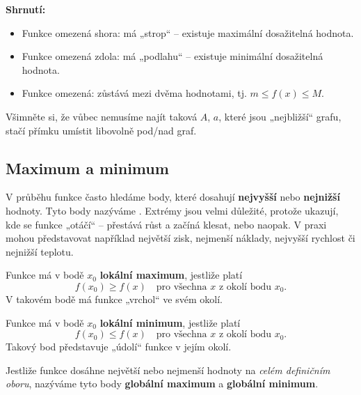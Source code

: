 \documentclass[12pt,a4paper]{article}
\begin{document}
\begin{notebox}
\textbf{Shrnutí:}
\begin{itemize}
    \item Funkce omezená shora: má „strop“ – existuje maximální dosažitelná hodnota.
    \item Funkce omezená zdola: má „podlahu“ – existuje minimální dosažitelná hodnota.
    \item Funkce omezená: zůstává mezi dvěma hodnotami, tj. \(m \leq f(x) \leq M\).
\end{itemize}
Všimněte si, že vůbec nemusíme najít taková $A$, $a$, které jsou „nejbližší“ grafu, 
stačí přímku umístit libovolně pod/nad graf.
\end{notebox}


\subsection*{Maximum a minimum}

V průběhu funkce často hledáme body, které dosahují \textbf{nejvyšší} nebo \textbf{nejnižší} hodnoty.  
Tyto body nazýváme .  
Extrémy jsou velmi důležité, protože ukazují, kde se funkce „otáčí“ – přestává růst a začíná klesat, nebo naopak.  
V praxi mohou představovat například největší zisk, nejmenší náklady, nejvyšší rychlost či nejnižší teplotu.

\begin{definitionbox}

    Funkce má v bodě \(x_0\) \textbf{lokální maximum}, jestliže platí
    \[
    f(x_0) \geq f(x)
    \quad \text{pro všechna } x \text{ z okolí bodu } x_0.
    \]
    V takovém bodě má funkce „vrchol“ ve svém okolí.

    \medskip
    Funkce má v bodě \(x_0\) \textbf{lokální minimum}, jestliže platí
    \[
    f(x_0) \leq f(x)
    \quad \text{pro všechna } x \text{ z okolí bodu } x_0.
    \]
    Takový bod představuje „údolí“ funkce v jejím okolí.

    Jestliže funkce dosáhne největší nebo nejmenší hodnoty na \emph{celém definičním oboru},  
    nazýváme tyto body \textbf{globální maximum} a \textbf{globální minimum}.
\end{definitionbox}
\end{document}

